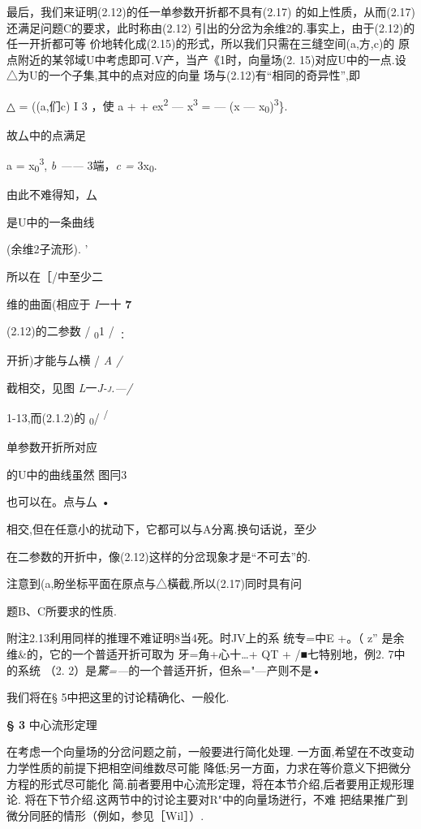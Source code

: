 \documentclass{article}
\begin{document}
最后，我们来证明(2.12)的任一单参数开折都不具有(2.17)
的如上性质，从而(2.17)还满足问题C的要求，此时称由(2.12)
引出的分岔为余维2的.事实上，由于(2.12)的任一开折都可等
价地转化成(2.15)的形式，所以我们只需在三缝空间(a,方,c)的
原点附近的某邻域U中考虑即可.V产，当\textbar{}产\textbar{}《1时，向量场(2.
15)对应U中的一点.设△为U的一个子集,其中的点对应的向量
场与(2.12)有``相同的奇异性'',即

△ = ((a,们c) I 3 ，使 a + + ex\textsuperscript{2} ---
x\textsuperscript{3} = --- (x ---
x\textsubscript{0})\textsuperscript{3}\}.

故厶中的点满足

a = x\textsubscript{0}\textsuperscript{3}, \emph{b ------} 3端，\emph{c
=} 3x\textsubscript{0}.

由此不难得知，厶

是U中的一条曲线

(余维2子流形). '

所以在［/中至少二

维的曲面(相应于 \emph{I}一十 \textbf{7}

(2.12)的二参数 / \textsubscript{0}1 {/} \textsubscript{：}

开折)才能与厶横 / \emph{A /}

截相交，见图 \emph{L}一\emph{\textsc{J-j.---/}}

1-13,而(2.1.2)的 \textsubscript{0}/ \textsuperscript{/}

单参数开折所对应

的U中的曲线虽然 图冃3

也可以在。点与厶 •

相交,但在任意小的扰动下，它都可以与A分离.换句话说，至少

在二参数的开折中，像(2.12)这样的分岔现象才是``不可去''的.

注意到(a,盼坐标平面在原点与△橫截,所以(2.17)同时具有问

题B、C所要求的性质.

附注2.13利用同样的推理不难证明8当4死。时JV上的系 统专=中E +。（
\textbar{}z\textbar{}'' 是余维\&的，它的一个普适开折可取为
牙=角+心十\ldots{}+ QT + /■七特别地，例2. 7中的系统 （2.
2）是\emph{驚=---}的一个普适开折，但糸="---产则不是•

我们将在§ 5中把这里的讨论精确化、一般化.

\protect\hypertarget{bookmark23}{}{}\textbf{§ 3} 中心流形定理

在考虑一个向量场的分岔问题之前，一般要进行简化处理.
一方面,希望在不改变动力学性质的前提下把相空间维数尽可能
降低;另一方面，力求在等价意义下把微分方程的形式尽可能化
简.前者要用中心流形定理，将在本节介绍,后者要用正规形理论.
将在下节介绍.这两节中的讨论主要对R"中的向量场迸行，不难
把结果推广到微分同胚的情形（例如，参见［Wil］）.
\end{document}
